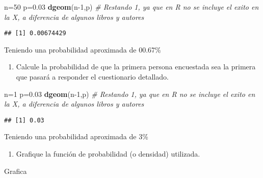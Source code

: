 \documentclass[
]{article}
\newenvironment{Shaded}{\begin{snugshade}}{\end{snugshade}}
\newcommand{\CommentTok}[1]{\textcolor[rgb]{0.56,0.35,0.01}{\textit{#1}}}
\newcommand{\DecValTok}[1]{\textcolor[rgb]{0.00,0.00,0.81}{#1}}
\newcommand{\FloatTok}[1]{\textcolor[rgb]{0.00,0.00,0.81}{#1}}
\newcommand{\FunctionTok}[1]{\textcolor[rgb]{0.13,0.29,0.53}{\textbf{#1}}}
\newcommand{\NormalTok}[1]{#1}
\newcommand{\OtherTok}[1]{\textcolor[rgb]{0.56,0.35,0.01}{#1}}
\providecommand{\tightlist}{%
  \setlength{\itemsep}{0pt}\setlength{\parskip}{0pt}}
\begin{document}
\begin{Shaded}
\begin{Highlighting}[]
\NormalTok{n}\OtherTok{=}\DecValTok{50}
\NormalTok{p}\OtherTok{=}\FloatTok{0.03}
\FunctionTok{dgeom}\NormalTok{(n}\DecValTok{{-}1}\NormalTok{,p) }\CommentTok{\# Restando 1, ya que en R no se incluye el exito en la X, a diferencia de algunos libros y autores}
\end{Highlighting}
\end{Shaded}

\begin{verbatim}
## [1] 0.00674429
\end{verbatim}

Teniendo una probabilidad aproximada de 00.67\%

\begin{enumerate}
\def\labelenumi{\arabic{enumi}.}
\setcounter{enumi}{2}
\tightlist
\item
  Calcule la probabilidad de que la primera persona encuestada sea la
  primera que pasará a responder el cuestionario detallado.
\end{enumerate}

\begin{Shaded}
\begin{Highlighting}[]
\NormalTok{n}\OtherTok{=}\DecValTok{1}
\NormalTok{p}\OtherTok{=}\FloatTok{0.03}
\FunctionTok{dgeom}\NormalTok{(n}\DecValTok{{-}1}\NormalTok{,p) }\CommentTok{\# Restando 1, ya que en R no se incluye el exito en la X, a diferencia de algunos libros y autores}
\end{Highlighting}
\end{Shaded}

\begin{verbatim}
## [1] 0.03
\end{verbatim}

Teniendo una probabilidad aproximada de 3\%

\begin{enumerate}
\def\labelenumi{\arabic{enumi}.}
\setcounter{enumi}{3}
\tightlist
\item
  Grafique la función de probabilidad (o densidad) utilizada.
\end{enumerate}

Grafica
\end{document}

